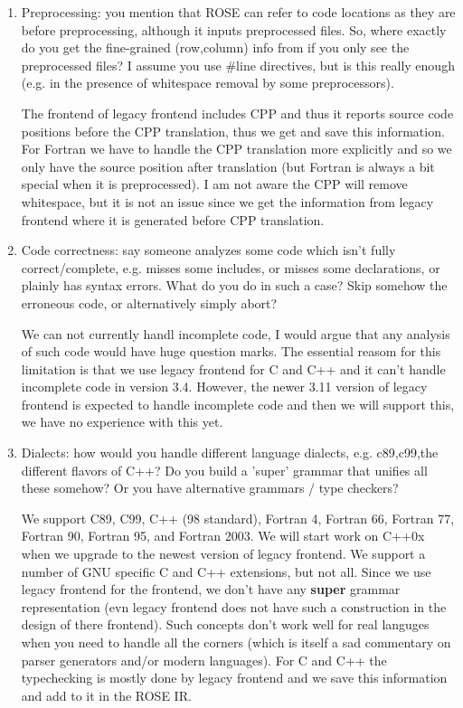\begin{enumerate}
\item Preprocessing: you mention that ROSE can refer to code locations as they are before
    preprocessing, although it inputs preprocessed files. So, where exactly do you get the
    fine-grained (row,column) info from if you only see the preprocessed files? I assume
    you use \#line directives, but is this really enough (e.g. in the presence of
    whitespace removal by some preprocessors).

    The frontend of legacy frontend includes CPP and thus it reports source code positions
    before the CPP translation, thus we get and save this information.  For Fortran
    we have to handle the CPP translation more explicitly and so we only have the
    source position after translation (but Fortran is always a bit special when it
    is preprocessed).  I am not aware the CPP will remove whitespace, but it is not
    an issue since we get the information from legacy frontend where it is generated before CPP
    translation.

\item Code correctness: say someone analyzes some code which isn't fully correct/complete,
    e.g. misses some includes, or misses some declarations, or plainly has syntax
    errors. What do you do in such a case? Skip somehow the erroneous code, or
    alternatively simply abort?

    We can not currently handl incomplete code, I would argue that any analysis of such
    code would have huge question marks. The essential reasom for this limitation is that 
    we use legacy frontend for C and C++ and it can't handle incomplete code in version 3.4. 
    However, the newer 3.11 version of legacy frontend is expected to handle incomplete code and then
    we will support this, we have no experience with this yet.

\item Dialects: how would you handle different language dialects, e.g. c89,c99,the
    different flavors of C++? Do you build a 'super' grammar that unifies
    all these somehow? Or you have alternative grammars / type checkers?

    We support C89, C99, C++ (98 standard), Fortran 4, Fortran 66, Fortran 77, Fortran 90,
    Fortran 95, and Fortran 2003.  We will start work on C++0x when we upgrade to the newest
    version of legacy frontend.  We support a number of GNU specific C and C++ extensions, but not
    all. Since we use legacy frontend for the frontend, we don't have any {\bf super} grammar
    representation (evn legacy frontend does not have such a construction in the design of there
    frontend).  Such concepts don't work well for real languges when you need to handle
    all the corners (which is itself a sad commentary on parser generators and/or modern 
    languages).  For C and C++ the typechecking is mostly done by legacy frontend and we save this
    information and add to it in the ROSE IR.


\end{enumerate}

